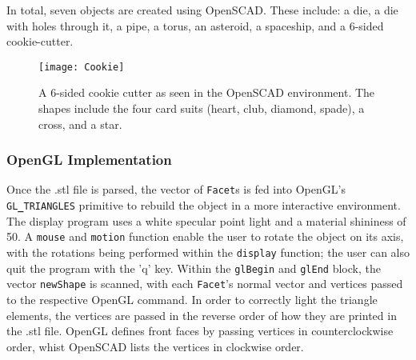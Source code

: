 \documentclass[12pt]{article}
\begin{document}
\begin{doublespace}
In total, seven objects are created using OpenSCAD. These include: a die, a die with holes through it, a pipe, a torus, an asteroid, a spaceship, and a 6-sided cookie-cutter.
\begin{figure}[h]
  \texttt{[image: Cookie]}
  \centering
  \caption{A 6-sided cookie cutter as seen in the OpenSCAD environment. The shapes include the four card suits (heart, club, diamond, spade), a cross, and a star.}
\end{figure}
\subsubsection{OpenGL Implementation}
Once the .stl file is parsed, the vector of \texttt{Facet}s is fed into OpenGL's \texttt{GL{\bf\_}TRIANGLES} primitive to rebuild the object in a more interactive environment. The display program uses a white specular point light and a material shininess of 50. A \texttt{mouse} and \texttt{motion} function enable the user to rotate the object on its axis, with the rotations being performed within the \texttt{display} function; the user can also quit the program with the 'q' key. Within the \texttt{glBegin} and \texttt{glEnd} block, the vector \texttt{newShape} is scanned, with each \texttt{Facet}'s normal vector and vertices passed to the respective OpenGL command. In order to correctly light the triangle elements, the vertices are passed in the reverse order of how they are printed in the .stl file. OpenGL defines front faces by passing vertices in counterclockwise order, whist OpenSCAD lists the vertices in clockwise order.

\end{doublespace}
\end{document}
